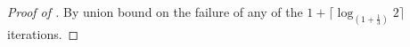 \documentclass[manuscript,screen,review]{acmart}
\begin{document}
\begin{proof}[Proof of ]

  By union bound on the failure of any of the $ 1 + \lceil \log_{(1 + \frac{1}{3})}{2} \rceil  $ iterations.

\end{proof}




%
\cite{leverrier2022quantum}
\cite{moore1998parallel}
\cite{bravyi2012magic}
\cite{Tillich_2014}
\cite{meier2012magicstate}

\printbibliography
\end{document}
